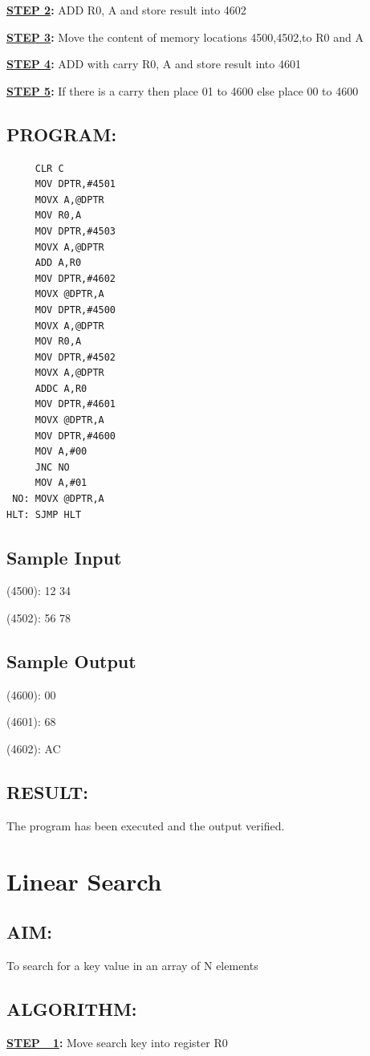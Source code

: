 \documentclass[a4paper,28pt]{report}
\begin{document}
\textbf{\underline{STEP 2}:} ADD R0, A and store result into 4602 

\textbf{\underline{STEP 3}:} Move the content of memory locations 4500,4502,to R0 and A

\textbf{\underline{STEP 4}:} ADD with carry R0, A and store result into 4601

\textbf{\underline{STEP 5}:} If there is a carry then place 01 to 4600 else place 00 to 4600
\section*{PROGRAM:}
\begin{lstlisting}
     CLR C
     MOV DPTR,#4501
     MOVX A,@DPTR
     MOV R0,A
     MOV DPTR,#4503
     MOVX A,@DPTR
     ADD A,R0
     MOV DPTR,#4602
     MOVX @DPTR,A
     MOV DPTR,#4500
     MOVX A,@DPTR
     MOV R0,A
     MOV DPTR,#4502
     MOVX A,@DPTR
     ADDC A,R0
     MOV DPTR,#4601
     MOVX @DPTR,A
     MOV DPTR,#4600
     MOV A,#00
     JNC NO
     MOV A,#01
 NO: MOVX @DPTR,A
HLT: SJMP HLT
\end{lstlisting}
\section*{Sample Input}
(4500): 12 34

(4502): 56 78
\section*{Sample Output}
(4600): 00

(4601): 68

(4602): AC
\section*{RESULT:}
The program has been executed and the output verified.
%
%
\chapter{Linear Search}

\section*{AIM:}
To search for a key value in an array of N elements
\section*{ALGORITHM:}
\textbf{\underline{STEP\ \ 1}:} Move search key into register R0
\end{document}
